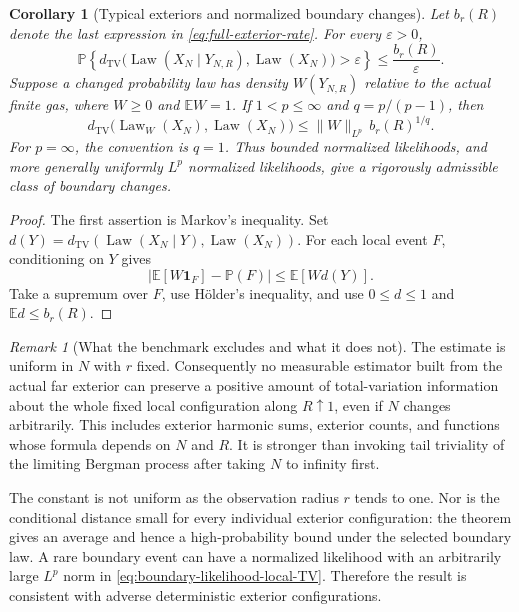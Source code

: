 \documentclass[11pt]{article}
\newtheorem{corollary}[theorem]{Corollary}
\theoremstyle{remark}\newtheorem{remark}[theorem]{Remark}
\begin{document}
\begin{corollary}[Typical exteriors and normalized boundary changes]
\label{cor:full-exterior-typical}
Let $b_r(R)$ denote the last expression in
\eqref{eq:full-exterior-rate}.  For every $\varepsilon>0$,
\[
 \mathbb P\!\left\{
 d_{\mathrm{TV}}\bigl(\operatorname{Law}(X_N\mid Y_{N,R}),
                     \operatorname{Law}(X_N)\bigr)>\varepsilon\right\}
 \le \frac{b_r(R)}{\varepsilon}.
\]
Suppose a changed probability law has density $W(Y_{N,R})$ relative
to the actual finite gas, where $W\ge0$ and $\mathbb EW=1$.  If
$1<p\le\infty$ and $q=p/(p-1)$, then
\begin{equation}\label{eq:boundary-likelihood-local-TV}
 d_{\mathrm{TV}}\bigl(\operatorname{Law}_{W}(X_N),
                     \operatorname{Law}(X_N)\bigr)
 \le \|W\|_{L^p}\,b_r(R)^{1/q}.
\end{equation}
For $p=\infty$, the convention is $q=1$.  Thus bounded normalized
likelihoods, and more generally uniformly $L^p$ normalized likelihoods,
give a rigorously admissible class of boundary changes.
\end{corollary}
\begin{proof}
The first assertion is Markov's inequality.  Set
$d(Y)=d_{\mathrm{TV}}(\operatorname{Law}(X_N\mid Y),
\operatorname{Law}(X_N))$.  For each local event $F$, conditioning on
$Y$ gives
\[
 |\mathbb E[W\mathbf1_F]-\mathbb P(F)|
 \le\mathbb E[W d(Y)].
\]
Take a supremum over $F$, use H\"older's inequality, and use
$0\le d\le1$ and $\mathbb Ed\le b_r(R)$.
\end{proof}

\begin{remark}[What the benchmark excludes and what it does not]
The estimate is uniform in $N$ with $r$ fixed.  Consequently no
measurable estimator built from the actual far exterior can preserve a
positive amount of total-variation information about the whole fixed
local configuration along $R\uparrow1$, even if $N$ changes arbitrarily.
This includes exterior harmonic sums, exterior counts, and functions
whose formula depends on $N$ and $R$.  It is stronger than invoking
tail triviality of the limiting Bergman process after taking $N$ to
infinity first.

The constant is not uniform as the observation radius $r$ tends to one.
Nor is the conditional distance small for every individual exterior
configuration: the theorem gives an average and hence a high-probability
bound under the selected boundary law.  A rare boundary event can have
a normalized likelihood with an arbitrarily large $L^p$ norm in
\eqref{eq:boundary-likelihood-local-TV}.  Therefore the result is
consistent with adverse deterministic exterior configurations.
\end{remark}
\end{document}
